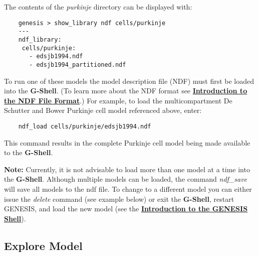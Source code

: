 \documentclass[12pt]{article}
\begin{document}
The contents of the {\it purkinje} directory can be displayed with:
\begin{verbatim}
    genesis > show_library ndf cells/purkinje
    ---
    ndf_library:
     cells/purkinje:
       - edsjb1994.ndf
       - edsjb1994_partitioned.ndf
\end{verbatim}

To run one of these models the model description file (NDF) must first be loaded into the {\bf G-Shell}.  (To learn more about the NDF format see  \href{../ndf-file-format/ndf-file-format.tex}{\bf Introduction to the NDF File Format}.) For example, to load the multicompartment De Schutter and Bower Purkinje cell model referenced above, enter:
\begin{verbatim}
    ndf_load cells/purkinje/edsjb1994.ndf
\end{verbatim}
This command results in the complete Purkinje cell model being made available to the {\bf G-Shell}.

{\bf Note:} Currently, it is not advisable to load more than one model at a time into the {\bf G-Shell}. Although multiple models can be loaded, the command {\it ndf\_save} will save all models to the ndf file. To change to a different model you can either issue the {\it delete} command (see example below) or exit the {\bf G-Shell}, restart GENESIS, and load the new model (see the \href{../gshell/gshell.tex}{\bf Introduction to the GENESIS Shell}).

\subsection*{Explore Model}
\end{document}
